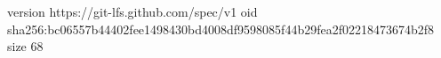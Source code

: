 version https://git-lfs.github.com/spec/v1
oid sha256:bc06557b44402fee1498430bd4008df9598085f44b29fea2f02218473674b2f8
size 68

